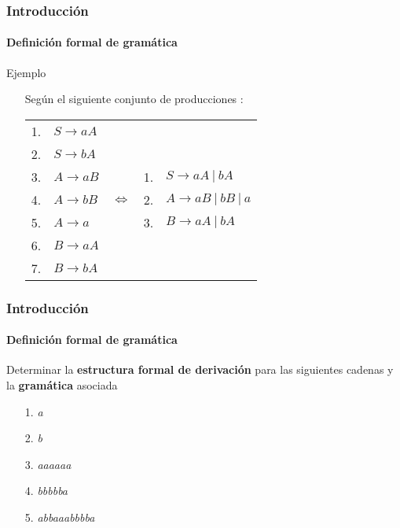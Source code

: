 \documentclass{beamer}
\begin{document}
        \begin{frame}
            \frametitle{Introducci\'on}
            \framesubtitle{Definici\'on formal de gram\'atica}

            \begin{exampleblock}{Ejemplo}
                \begin{itemize}
                    \item[\checkmark] Seg\'un el siguiente conjunto de producciones : \\
                    \begin{flushleft}
                        \begin{tabular}{llcll}
                            1. & $S \rightarrow aA$ &&& \\
                            2. & $S \rightarrow bA$ &&& \\
                            3. & $A \rightarrow aB$ && 1. & $S \rightarrow aA~|~bA$ \\
                            4. & $A \rightarrow bB$ &$\Leftrightarrow$ & 2. & $A \rightarrow aB~|~bB~|~a$ \\
                            5. & $A \rightarrow a$  && 3. & $B \rightarrow aA~|~bA$ \\
                            6. & $B \rightarrow aA$ &&& \\
                            7. & $B \rightarrow bA$ &&& \\
                        \end{tabular}
                    \end{flushleft}
                \end{itemize}
			\end{exampleblock}
		\end{frame}

        \begin{frame}
            \frametitle{Introducci\'on}
            \framesubtitle{Definici\'on formal de gram\'atica}

            \begin{exampleblock}{Determinar la \textbf{estructura formal de derivaci\'on} para las siguientes cadenas y la \textbf{gram\'atica} asociada}
                \begin{itemize}
                    \item[1.] \emph{a}
                    \item[2.] \emph{b}
                    \item[3.] \emph{aaaaaa}
                    \item[4.] \emph{bbbbba}
                    \item[5.] \emph{abbaaabbbba}
                \end{itemize}
			\end{exampleblock}
		\end{frame}
		
\end{document}
